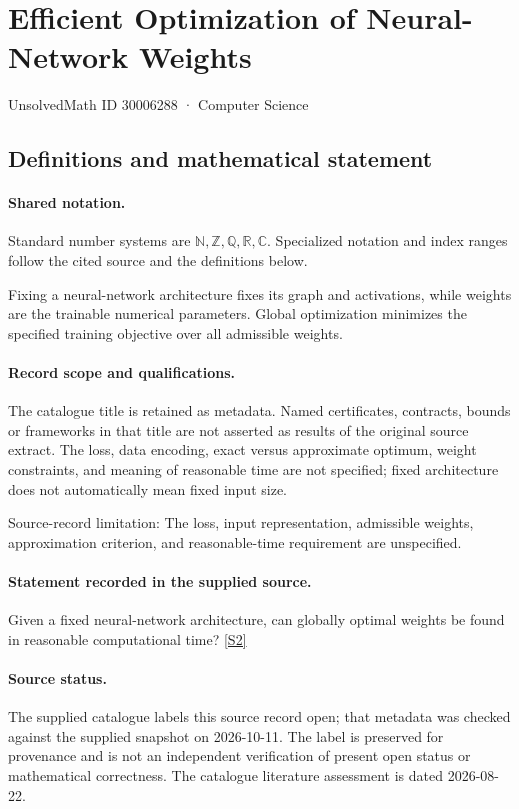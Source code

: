 \documentclass[11pt]{article}
\newcommand{\sref}[2]{\hyperlink{source:#1:#2}{[S#2]}}
\begin{document}
\setcounter{section}{30006287}
\section{Efficient Optimization of Neural-Network Weights}\label{30006288}
{\small\sffamily UnsolvedMath ID 30006288 · Computer Science}
\subsection{Definitions and mathematical statement}

\paragraph{Shared notation.}Standard number systems are $\mathbb N,\mathbb Z,\mathbb Q,\mathbb R,\mathbb C$. Specialized notation and index ranges follow the cited source and the definitions below.


Fixing a neural-network architecture fixes its graph and activations, while weights are the trainable numerical parameters. Global optimization minimizes the specified training objective over all admissible weights.
\paragraph{Record scope and qualifications.}
The catalogue title is retained as metadata. Named certificates, contracts, bounds or frameworks in that title are not asserted as results of the original source extract.
The loss, data encoding, exact versus approximate optimum, weight constraints, and meaning of reasonable time are not specified; fixed architecture does not automatically mean fixed input size.

Source-record limitation: The loss, input representation, admissible weights, approximation criterion, and reasonable-time requirement are unspecified.
\paragraph{Statement recorded in the supplied source.}
Given a fixed neural-network architecture, can globally optimal weights be found in reasonable computational time? \sref{30006288}{2}
\paragraph{Source status.}
The supplied catalogue labels this source record open; that metadata was checked against the supplied snapshot on 2026-10-11. The label is preserved for provenance and is not an independent verification of present open status or mathematical correctness. The catalogue literature assessment is dated 2026-08-22.
\end{document}
